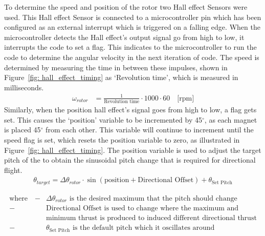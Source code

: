             To determine the speed and position of the rotor two Hall effect Sensors were used. This Hall effect Sensor is connected to a microcontroller pin which has been configured as an external interrupt which is triggered on a falling edge. When the microcontroller detects the Hall effect's output signal go from high to low, it interrupts the code  to set a flag. This indicates to the microcontroller to run the code to determine the angular velocity in the next iteration of code. The speed is determined by measuring the time in between these impulses, shown in Figure~\ref{fig: hall_effect_timing} as `Revolution time', which is measured in milliseconds.
            \begin{align*}
                \omega_{rotor} &= \frac{1}{\text{Revolution time}} \cdot 1000 \cdot 60 \quad \text{[rpm]}
            \end{align*}
            Similarly, when the position hall effect's signal goes from high to low, a flag gets set. This causes the `position' variable to be incremented by 45\(^\circ\), as each magnet is placed 45\(^\circ\) from each other. This variable will continue to increment until the speed flag is set, which resets the position variable to zero, as illustrated in Figure~\ref{fig: hall_effect_timing}. The position variable is used to adjust the target pitch of the to obtain the sinusoidal pitch change that is required for directional flight.
            \begin{align*}
                \theta_{target} = \Delta \theta_{rotor} \cdot \sin(\text{position} + \text{Directional Offset}) + \theta_{\text{Set Pitch}}
            \end{align*}
            \begin{minipage}{0.45\textwidth}
                \vspace*{-8mm}
                \begin{align*}
                    \text{where} \quad
                    -&\Delta\theta_{rotor} \text{ is the desired maximum that the pitch should change} \\
                    -&\text{Directional Offset is used to change where the maximum and} \\ & \text{minimum thrust is produced to induced different directional thrust}\\
                    -&\theta_{\text{Set Pitch}} \text{ is the default pitch which it oscillates around}
                \end{align*}
                \end{minipage}
